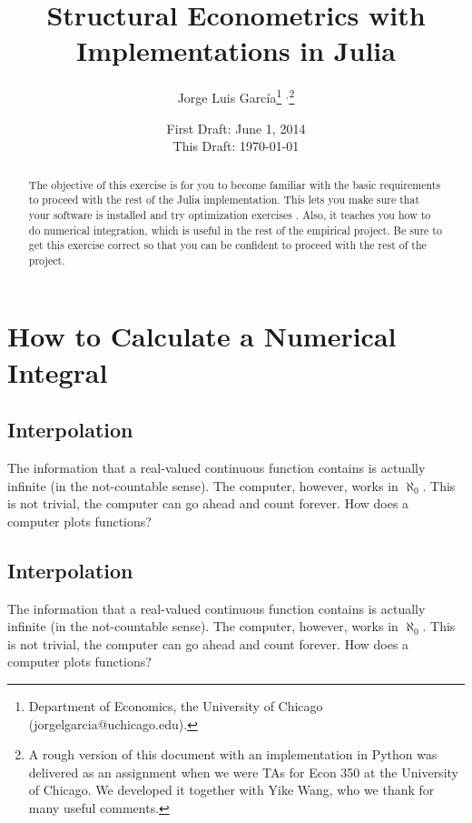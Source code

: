 



\title{\textbf{Structural Econometrics with Implementations in Julia}}
\author{Jorge Luis Garc\'{i}a\thanks{Department of Economics, the University of Chicago (jorgelgarcia@uchicago.edu).} $^{,}$\thanks{A rough version of this document with an implementation in Python was delivered as an assignment when we were TAs for Econ 350 at the University of Chicago. We developed it together with Yike Wang, who we thank for many useful comments.}}
\date{First Draft: June 1, 2014 \\ This Draft: \today}
\maketitle

\begin{abstract}
\noindent The objective of this exercise is for you to become familiar with the basic requirements to proceed with the rest of the Julia implementation. This lets you make sure that your software is installed and try optimization exercises . Also, it teaches you how to do numerical integration, which is useful in the rest of the empirical project. Be sure to get this exercise correct so that you can be confident to proceed with the rest of the project. 
\end{abstract}

\section{How to Calculate a Numerical Integral}

\subsection{Interpolation}
The information that a real-valued continuous function contains is actually infinite (in the not-countable sense). The computer, however, works in $\aleph_{0}$. This is not trivial, the computer can go ahead and count forever. How does a computer plots functions?
\subsection{Interpolation}
The information that a real-valued continuous function contains is actually infinite (in the not-countable sense). The computer, however, works in $\aleph_{0}$. This is not trivial, the computer can go ahead and count forever. How does a computer plots functions?

